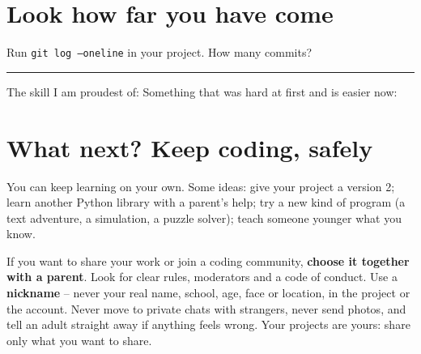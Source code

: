 \section{Look how far you have come}
\begin{center}
\end{center}

\begin{exercise}
Run \texttt{git log --oneline} in your project. How many commits? \rule{1.5cm}{0.4pt}
The skill I am proudest of: 
Something that was hard at first and is easier now: 
\end{exercise}

\section{What next? Keep coding, safely}
You can keep learning on your own. Some ideas: give your project a version 2; learn another Python library with a parent's help; try a new kind of program (a text adventure, a simulation, a puzzle solver); teach someone younger what you know.

\begin{safety}
If you want to share your work or join a coding community, \textbf{choose it together with a parent}. Look for clear rules, moderators and a code of conduct. Use a \textbf{nickname} -- never your real name, school, age, face or location, in the project or the account. Never move to private chats with strangers, never send photos, and tell an adult straight away if anything feels wrong. Your projects are yours: share only what you want to share.
\end{safety}

